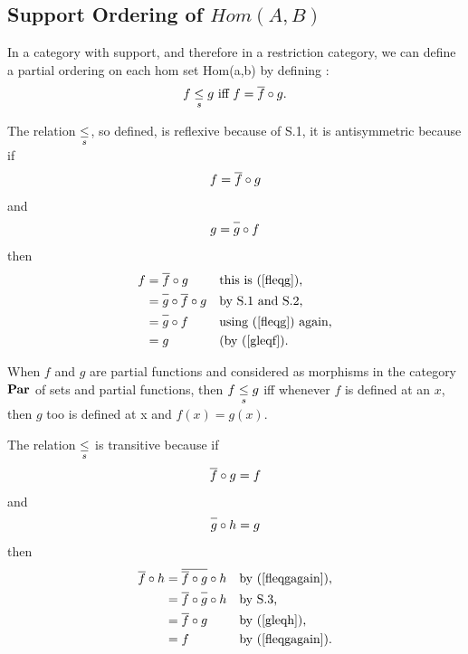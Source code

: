 \subsection{Support Ordering of $Hom(A,B)$}

In a category with support, and therefore in a restriction category, we can define a partial ordering on each hom set
Hom(a,b) by defining :
$$f \sleq g \mbox{ iff } f = \rst{f} \circ g.$$

The relation $\mathrel{\underset{s}{\leq}}$, so defined, is reflexive because of S.1, it is antisymmetric because if
\begin{equation}
\label{fleqg}
f = \rst{f} \circ g
\end{equation}
and
\begin{equation}
\label{gleqf}
g = \rst{g} \circ f
\end{equation}
then
\begin{align*}
f &= \rst{f} \circ g &&\mbox {this is (\ref{fleqg}),}        \\
  &= \rst{g} \circ \rst{f} \circ g &&\mbox{by S.1 and S.2,}\\
  &= \rst{g} \circ f               &&\mbox{using (\ref{fleqg}) again,} \\
  &= g                             &&\mbox{(by (\ref{gleqf}).} 
\end{align*}

When $f$ and $g$ are partial functions and
considered as morphisms in the category $\textbf{Par}$ of sets and partial functions,  
then  $f \mathrel{\underset{s}{\leq}} g$ iff  whenever $f$ is defined at an $x$,  then $g$ too is defined at x and $f(x) = g(x)$.

The relation $\mathrel{\underset{s}{\leq}}$ is transitive because if
\begin{equation}
\label{fleqgagain}
\rst{f} \circ g =f
\end{equation}
and
\begin{equation}
\label{gleqh}
\rst{g} \circ h = g
\end{equation}
then
\begin{align*}
\rst{f} \circ h
&= \rst{\rst{f} \circ g} \circ h
&&\mbox{by (\ref{fleqgagain}),}\\
&= \rst {f} \circ \rst{g} \circ h
&&\mbox{by S.3,}\\
&= \rst{f} \circ g
&&\mbox{by (\ref{gleqh}),}\\
&= f
&&\mbox{by (\ref{fleqgagain}).}
\end{align*}

